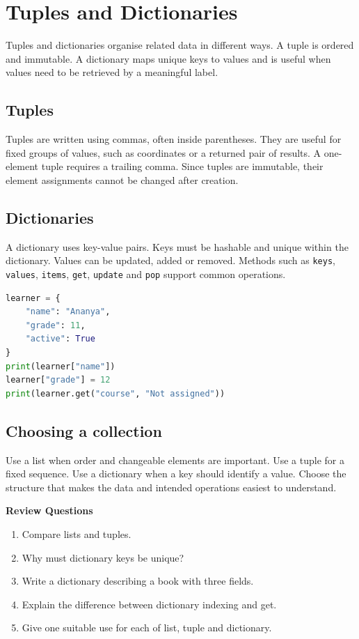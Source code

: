 \documentclass[11pt,openany,oneside]{book}
\newcommand{\reviewtitle}{\par\noindent\textbf{\color{Navy}Review Questions}\par}
\begin{document}
\chapter{Tuples and Dictionaries}
Tuples and dictionaries organise related data in different ways. A tuple is ordered and immutable. A dictionary maps unique keys to values and is useful when values need to be retrieved by a meaningful label.

\section{Tuples}
Tuples are written using commas, often inside parentheses. They are useful for fixed groups of values, such as coordinates or a returned pair of results. A one-element tuple requires a trailing comma. Since tuples are immutable, their element assignments cannot be changed after creation.

\section{Dictionaries}
A dictionary uses key-value pairs. Keys must be hashable and unique within the dictionary. Values can be updated, added or removed. Methods such as \texttt{keys}, \texttt{values}, \texttt{items}, \texttt{get}, \texttt{update} and \texttt{pop} support common operations.

\begin{lstlisting}[style=webcode,language=Python]
learner = {
    "name": "Ananya",
    "grade": 11,
    "active": True
}
print(learner["name"])
learner["grade"] = 12
print(learner.get("course", "Not assigned"))
\end{lstlisting}

\section{Choosing a collection}
Use a list when order and changeable elements are important. Use a tuple for a fixed sequence. Use a dictionary when a key should identify a value. Choose the structure that makes the data and intended operations easiest to understand.

\reviewtitle
\begin{enumerate}
\item Compare lists and tuples.
\item Why must dictionary keys be unique?
\item Write a dictionary describing a book with three fields.
\item Explain the difference between dictionary indexing and get.
\item Give one suitable use for each of list, tuple and dictionary.
\end{enumerate}
\end{document}
